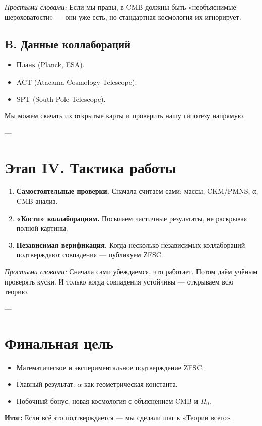 \documentclass[a4paper,12pt]{article}
\begin{document}
\textit{Простыми словами:}  
Если мы правы, в CMB должны быть «необъяснимые шероховатости» — они уже есть, но стандартная космология их игнорирует.

\subsection*{B. Данные коллабораций}
\begin{itemize}
  \item Планк (Planck, ESA).  
  \item ACT (Atacama Cosmology Telescope).  
  \item SPT (South Pole Telescope).  
\end{itemize}

Мы можем скачать их открытые карты и проверить нашу гипотезу напрямую.

---

\section*{Этап IV. Тактика работы}
\begin{enumerate}
  \item \textbf{Самостоятельные проверки.} Сначала считаем сами: массы, CKM/PMNS, α, CMB-анализ.  
  \item \textbf{«Кости» коллаборациям.} Посылаем частичные результаты, не раскрывая полной картины.  
  \item \textbf{Независимая верификация.} Когда несколько независимых коллабораций подтверждают совпадения — публикуем ZFSC.  
\end{enumerate}

\textit{Простыми словами:}  
Сначала сами убеждаемся, что работает. Потом даём учёным проверять куски. И только когда совпадения устойчивы — открываем всю теорию.

---

\section*{Финальная цель}
\begin{itemize}
  \item Математическое и экспериментальное подтверждение ZFSC.  
  \item Главный результат: $\alpha$ как геометрическая константа.  
  \item Побочный бонус: новая космология с объяснением CMB и $H_0$.  
\end{itemize}

\textbf{Итог:}  
Если всё это подтверждается — мы сделали шаг к «Теории всего».  
\end{document}
